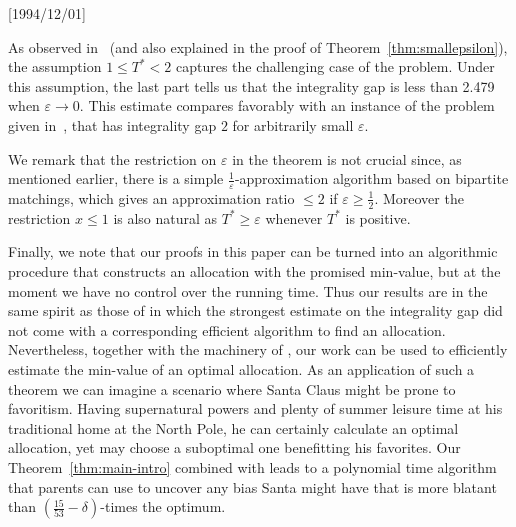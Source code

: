 \NeedsTeXFormat{LaTeX2e}[1994/12/01]\documentclass[letterpaper, 11pt]{article}
\theoremstyle{definition}
\theoremstyle{remark}
\numberwithin{equation}{section}
\begin{document}
As observed in~\cite{chantangwu} (and also explained in the proof
of Theorem~\ref{thm:smallepsilon}), the assumption $1\leq T^*<2$
captures the challenging case of the problem. Under this assumption,
the last part tells us that the integrality gap is less than 2.479
when $\varepsilon\rightarrow 0$.
This estimate compares favorably with an instance of the
problem given in~\cite{chantangwu}, that has integrality gap $2$ for
arbitrarily small $\varepsilon$.

We remark that the restriction on $\varepsilon$ in the theorem
is not crucial since, as mentioned earlier, there is 
a simple $\frac{1}{\varepsilon}$-approximation algorithm based on
bipartite matchings, which gives an approximation ratio $\leq 2$ if
$\varepsilon\geq \frac{1}{2}$. Moreover the restriction $x\leq 1$ is
also natural as $T^* \geq \varepsilon$ whenever $T^*$ is positive.

Finally, we note that our proofs in this paper can be turned into an
algorithmic procedure that constructs an allocation with the promised
min-value, but at the moment we have no control over the running
time. Thus  our results are in the same 
spirit as those of \cite{feige,asadpourfeigesaberi,
  chantangwu,jansenrohwedder,chengmao18b, chengmao19} in which the
strongest estimate on the integrality gap did not come with a
corresponding efficient algorithm to find an allocation. 
Nevertheless, together with the machinery of
\cite{bansalsviridenko}, our work can be used to efficiently
estimate the min-value of an optimal allocation.
As an application of such a theorem we can imagine a scenario where
Santa Claus might be prone to favoritism. Having
supernatural powers and plenty of summer leisure time at his
  traditional home at the North Pole, he can certainly calculate an optimal
allocation, yet may choose a suboptimal one benefitting his favorites. 
Our Theorem~\ref{thm:main-intro} combined with \cite{bansalsviridenko}
leads to a polynomial time
algorithm that parents can use to uncover any bias
Santa might have that is more blatant than $(\frac{15}{53} -\delta)$-times
the optimum.
\end{document}

